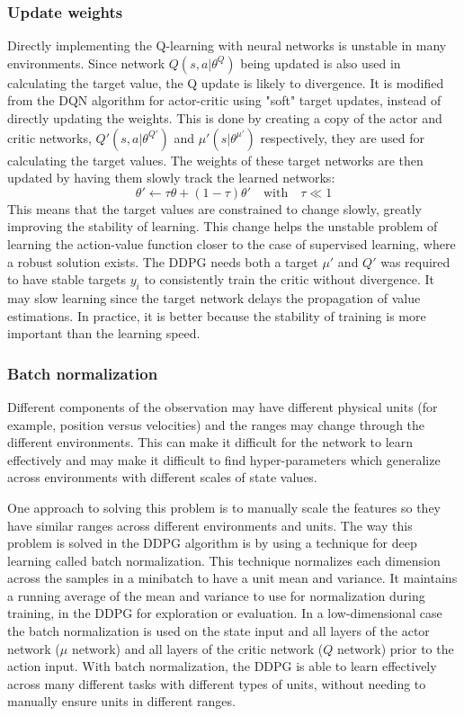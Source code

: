 \subsubsection{Update weights}
Directly implementing the Q-learning with neural networks is unstable in many environments. Since network $Q(s,a|\theta^Q)$ being updated is also used in calculating the target value, the Q update is likely to divergence. It is modified from the DQN algorithm for actor-critic using "soft" target updates, instead of directly updating the weights. This is done by creating a copy of the actor and critic networks, $Q'(s,a|\theta^{Q'})$ and $\mu'(s|\theta^{\mu'})$ respectively, they are used for calculating the target values. The weights of these target networks are then updated by having them slowly track the learned networks: 
\begin{equation}
\theta' \leftarrow \tau \theta + (1-\tau)\theta'   \quad \textrm{with} \quad \tau \ll 1 
\end{equation}   
This means that the target values are constrained to change slowly, greatly improving the stability of learning. This change helps the unstable problem of learning the action-value function closer to the case of supervised learning, where a robust solution exists. The DDPG needs both a target $\mu'$ and $Q'$ was required to have stable targets $y_i$ to consistently train the critic without divergence. It may slow learning since the target network delays the propagation of value estimations. In practice, it is better because the stability of training is more important than the learning speed.

\subsubsection{Batch normalization}
Different components of the observation may have different physical units (for example, position versus velocities) and the ranges may change through the different environments. This can make it difficult for the network to learn effectively and may make it difficult to find hyper-parameters which generalize across environments with different scales of state values.

One approach to solving this problem is to manually scale the features so they have similar ranges across different environments and units. The way this problem is solved in the DDPG algorithm is by using a technique for deep learning called batch normalization. This technique normalizes each dimension across the samples in a minibatch to have a unit mean and variance. It maintains a running average of the mean and variance to use for normalization during training, in the DDPG for exploration or evaluation. In a low-dimensional case the batch normalization is used on the state input and all layers of the actor network ($\mu$ network) and all layers of the critic network ($Q$ network) prior to the action input. With batch normalization, the DDPG is able to learn effectively across many different tasks with different types of units, without needing to manually ensure units in different ranges.

